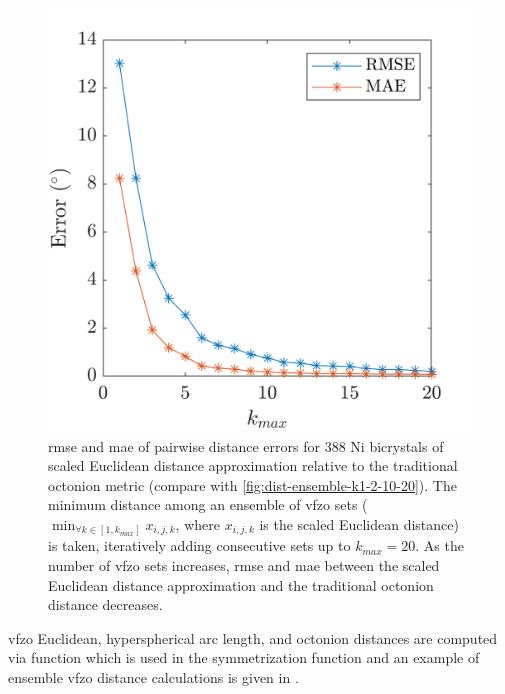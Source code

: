 \documentclass[final,twocolumn,12pt]{elsarticle}
\begin{document}
\begin{figure}
    \centering
    \includegraphics[scale=1]{figures/dist-ensemble-rmse-mae.png}
    \caption{\Gls{rmse} and \gls{mae} of pairwise distance errors for 388 Ni bicrystals \cite{olmstedSurveyComputedGrain2009} of scaled Euclidean distance approximation relative to the traditional octonion metric \cite{chesserLearningGrainBoundary2020} (compare with \cref{fig:dist-ensemble-k1-2-10-20}). The minimum distance among an ensemble of \gls{vfzo} sets ($\min_{\forall k \in [1,k_{max}]}x_{i,j,k}$, where $x_{i,j,k}$ is the scaled Euclidean distance) is taken, iteratively adding consecutive sets up to $k_{max} = 20$. As the number of \gls{vfzo} sets increases, \gls{rmse} and \gls{mae} between the scaled Euclidean distance approximation and the traditional octonion distance decreases.}
    \label{fig:dist-ensemble-rmse-mae}
\end{figure}

\Gls{vfzo} Euclidean, hyperspherical arc length, and octonion distances are computed via \vfzorepo{} function  which is used in the symmetrization function  and an example of ensemble \gls{vfzo} distance calculations is given in .
\end{document}
